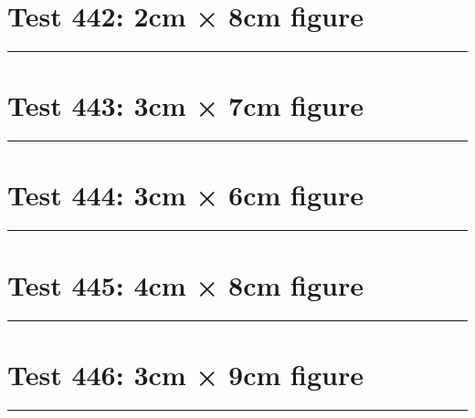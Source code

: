\documentclass[a4paper,11pt]{article}
\begin{document}
\section*{Test 442: 2cm × 8cm figure}
\begin{swarmwrap}%
  \begin{minipage}[t]{2cm}
    \centering
    \rule{\linewidth}{8cm}
  \end{minipage}%
\end{swarmwrap}%
\swarmwrapnext
\lipsum[141]
\lipsum[142]
\lipsum[143]
\lipsum[144]
\section*{Test 443: 3cm × 7cm figure}
\begin{swarmwrap}%
  \begin{minipage}[t]{3cm}
    \centering
    \rule{\linewidth}{7cm}
  \end{minipage}%
\end{swarmwrap}%
\swarmwrapnext
\lipsum[22]
\lipsum[23]
\lipsum[24]
\section*{Test 444: 3cm × 6cm figure}
\begin{swarmwrap}%
  \begin{minipage}[t]{3cm}
    \centering
    \rule{\linewidth}{6cm}
  \end{minipage}%
\end{swarmwrap}%
\swarmwrapnext
\lipsum[116]
\lipsum[117]
\lipsum[118]
\lipsum[119]
\lipsum[120]
\section*{Test 445: 4cm × 8cm figure}
\begin{swarmwrap}%
  \begin{minipage}[t]{4cm}
    \centering
    \rule{\linewidth}{8cm}
  \end{minipage}%
\end{swarmwrap}%
\swarmwrapnext
\lipsum[115]
\lipsum[116]
\lipsum[117]
\lipsum[118]
\section*{Test 446: 3cm × 9cm figure}
\begin{swarmwrap}%
  \begin{minipage}[t]{3cm}
    \centering
    \rule{\linewidth}{9cm}
  \end{minipage}%
\end{swarmwrap}%
\swarmwrapnext
\lipsum[92]
\lipsum[93]
\lipsum[94]
\end{document}
